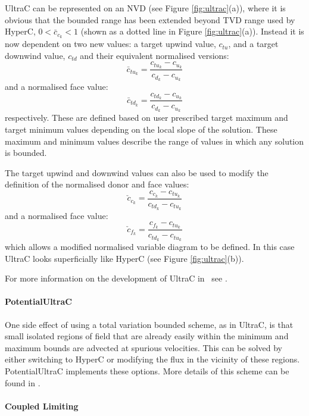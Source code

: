 UltraC can be represented on an NVD (see Figure \ref{fig:ultrac}(a)), where it is obvious that the bounded range has been extended beyond TVD range used by HyperC, $0<\bar{c}_{c_k}<1$ (shown as a dotted line in Figure \ref{fig:ultrac}(a)).  Instead it is now dependent on two new values: a target upwind value, $c_{tu}$, and a target downwind value, $c_{td}$ and their equivalent normalised versions:
\begin{equation}
\bar{c}_{tu_k} = \frac{c_{tu_k}-c_{u_k}}{c_{d_k}-c_{u_k}}
\end{equation}
and a normalised face value:
\begin{equation}
\bar{c}_{td_k} = \frac{c_{td_k}-c_{u_k}}{c_{d_k}-c_{u_k}}
\end{equation}
respectively.  These are defined based on user prescribed target maximum and target minimum values depending on the local slope of the solution.  These maximum and minimum values describe the range of values in which any solution is bounded.

The target upwind and downwind values can also be used to modify the definition of the normalised donor and face values:
\begin{equation}
\check{c}_{c_k} = \frac{c_{c_k}-c_{tu_k}}{c_{td_k}-c_{tu_k}}
\end{equation}
and a normalised face value:
\begin{equation}
\check{c}_{f_k} = \frac{c_{f_k}-c_{tu_k}}{c_{td_k}-c_{tu_k}}
\end{equation}
which allows a modified normalised variable diagram to be defined.  In this case UltraC looks superficially like HyperC (see Figure \ref{fig:ultrac}(b)).

For more information on the development of UltraC in \fluidity\ see \citet{wilson_phdthesis_2009}.

\paragraph{PotentialUltraC}

One side effect of using a total variation bounded scheme, as in UltraC, is that small isolated regions of field that are already easily within the minimum and maximum bounds are advected at spurious velocities.  This can be solved by either switching to HyperC or modifying the flux in the vicinity of these regions.  PotentialUltraC implements these options.  More details of this scheme can be found in \citep{wilson_phdthesis_2009}.

\paragraph{Coupled Limiting}

